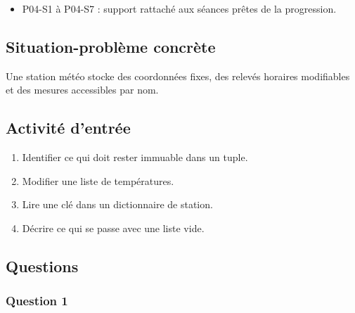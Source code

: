 \begin{itemize}
\tightlist
\item
  P04-S1 à P04-S7 : support rattaché aux séances prêtes de la
  progression.
\end{itemize}

\subsection{Situation-problème concrète}

Une station météo stocke des coordonnées fixes, des relevés horaires
modifiables et des mesures accessibles par nom.

\subsection{Activité d’entrée}

\begin{enumerate}
\def\labelenumi{\arabic{enumi}.}
\tightlist
\item
  Identifier ce qui doit rester immuable dans un tuple.
\item
  Modifier une liste de températures.
\item
  Lire une clé dans un dictionnaire de station.
\item
  Décrire ce qui se passe avec une liste vide.
\end{enumerate}

\subsection{Questions}

\subsubsection{Question 1}


